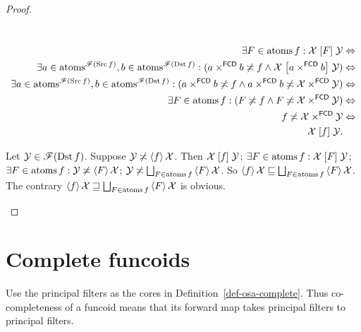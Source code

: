 \begin{proof}
~
\begin{widedisorder}
\item [{\ref{ffilt-r}}] ~
\begin{align*}
\exists F\in\operatorname{atoms} f:\mathcal{X}\mathrel{\left[F\right]}\mathcal{Y} & \Leftrightarrow\\
\exists a\in\operatorname{atoms}^{\mathscr{F}(\operatorname{Src} f)},b\in\operatorname{atoms}^{\mathscr{F}(\operatorname{Dst}
f)}:(a\times^{\mathsf{FCD}}b\not\asymp
f\land\mathcal{X}\mathrel{\left[a\times^{\mathsf{FCD}}b\right]}\mathcal{Y}) &
\Leftrightarrow\\
\exists a\in\operatorname{atoms}^{\mathscr{F}(\operatorname{Src} f)},b\in\operatorname{atoms}^{\mathscr{F}(\operatorname{Dst}
f)}:(a\times^{\mathsf{FCD}}b\not\asymp f\land
a\times^{\mathsf{FCD}}b\not\asymp\mathcal{X}\times^{\mathsf{FCD}}\mathcal{Y}) &
\Leftrightarrow\\
\exists F\in\operatorname{atoms} f:(F\not\asymp f\land
F\not\asymp\mathcal{X}\times^{\mathsf{FCD}}\mathcal{Y}) & \Leftrightarrow\\
f\not\asymp\mathcal{X}\times^{\mathsf{FCD}}\mathcal{Y} & \Leftrightarrow\\
\mathcal{X}\mathrel{\left[f\right]}\mathcal{Y}.
\end{align*}

\item [{\ref{ffilt-f}}] Let $\mathcal{Y}\in\mathscr{F}(\operatorname{Dst} f)$. Suppose
$\mathcal{Y}\not\asymp\left\langle f\right\rangle\mathcal{X}$. Then $\mathcal{X}\mathrel{\left[f\right]}\mathcal{Y}$;
$\exists F\in\operatorname{atoms} f:\mathcal{X}\mathrel{\left[F\right]}\mathcal{Y}$; $\exists F\in\operatorname{atoms}
f:\mathcal{Y}\not\asymp\left\langle F\right\rangle\mathcal{X}$;
$\mathcal{Y}\nasymp\bigsqcup_{F\in\atoms f}\supfun F\mathcal{X}$.
So $\supfun f\mathcal{X}\sqsubseteq\bigsqcup_{F\in\atoms f}\supfun
F\mathcal{X}$.
The contrary $\supfun f\mathcal{X}\sqsupseteq\bigsqcup_{F\in\atoms f}\supfun
F\mathcal{X}$
is obvious.
\end{widedisorder}
\end{proof}

\section{Complete funcoids}
Use the principal filters as the cores in
Definition~\ref{def-osa-complete}. Thus co-completeness of a funcoid
means that its forward map takes principal filters to principal
filters.

